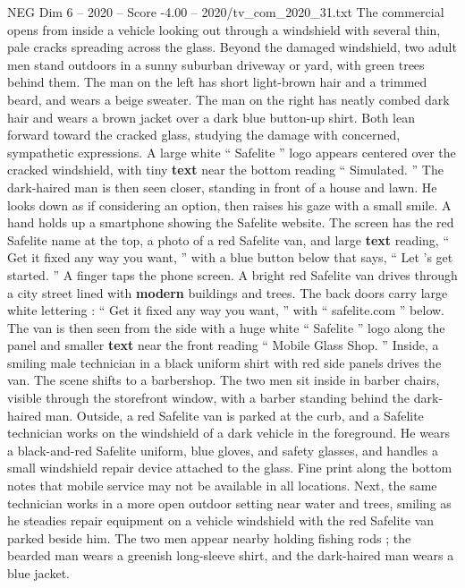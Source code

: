 \begin{textsample}{NEG Dim 6 – 2020 – Score -4.00 – 2020/tv\_com\_2020\_31.txt}  \label{ex:f6_neg_033}
The commercial opens from inside a vehicle looking out through a windshield with several thin, pale cracks spreading across the glass.
Beyond the damaged windshield, two adult men stand outdoors in a sunny suburban driveway or yard, with green trees behind them.
The man on the left has short light-brown hair and a trimmed beard, and wears a beige sweater.
The man on the right has neatly combed dark hair and wears a brown jacket over a dark blue button-up shirt.
Both lean forward toward the cracked glass, studying the damage with concerned, sympathetic expressions.
A large white “ Safelite ” logo appears centered over the cracked windshield, with tiny \textbf{text} near the bottom reading “ Simulated. ” The dark-haired man is then seen closer, standing in front of a house and lawn.
He looks down as if considering an option, then raises his gaze with a small smile.
A hand holds up a smartphone showing the Safelite website.
The screen has the red Safelite name at the top, a photo of a red Safelite van, and large \textbf{text} reading, “ Get it fixed any way you want, ” with a blue button below that says, “ Let ’s get started. ” A finger taps the phone screen.
A bright red Safelite van drives through a city street lined with \textbf{modern} buildings and trees.
The back doors carry large white lettering : “ Get it fixed any way you want, ” with “ safelite.com ” below.
The van is then seen from the side with a huge white “ Safelite ” logo along the panel and smaller \textbf{text} near the front reading “ Mobile Glass Shop. ” Inside, a smiling male technician in a black uniform shirt with red side panels drives the van.
The scene shifts to a barbershop.
The two men sit inside in barber chairs, visible through the storefront window, with a barber standing behind the dark-haired man.
Outside, a red Safelite van is parked at the curb, and a Safelite technician works on the windshield of a dark vehicle in the foreground.
He wears a black-and-red Safelite uniform, blue gloves, and safety glasses, and handles a small windshield repair device attached to the glass.
Fine print along the bottom notes that mobile service may not be available in all locations.
Next, the same technician works in a more open outdoor setting near water and trees, smiling as he steadies repair equipment on a vehicle windshield with the red Safelite van parked beside him.
The two men appear nearby holding fishing rods ; the bearded man wears a greenish long-sleeve shirt, and the dark-haired man wears a blue jacket.

\end{textsample}
